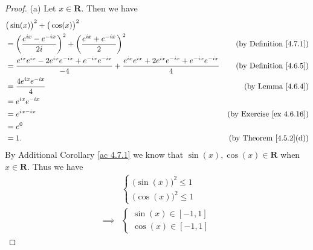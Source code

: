 \begin{proof}{(a)}
    Let \(x \in \mathbf{R}\).
    Then we have
    \begin{align*}
         & \big(\sin(x)\big)^2 + \big(\cos(x)\big)^2                                                                                                                                               \\
         & = \bigg(\frac{e^{i x} - e^{- i x}}{2i}\bigg)^2 + \bigg(\frac{e^{i x} + e^{- i x}}{2}\bigg)^2                                                     & \text{(by Definition \ref{4.7.1})}   \\
         & = \frac{e^{i x} e^{i x} - 2 e^{i x} e^{- i x} + e^{- i x} e^{- i x}}{-4} + \frac{e^{i x} e^{i x} + 2 e^{i x} e^{- i x} + e^{- i x} e^{- i x}}{4} & \text{(by Definition \ref{4.6.5})}   \\
         & = \frac{4 e^{i x} e^{- i x}}{4}                                                                                                                  & \text{(by Lemma \ref{4.6.4})}        \\
         & = e^{i x} e^{- i x}                                                                                                                                                                     \\
         & = e^{i x - i x}                                                                                                                                  & \text{(by Exercise \ref{ex 4.6.16})} \\
         & = e^0                                                                                                                                                                                   \\
         & = 1.                                                                                                                                             & \text{(by Theorem \ref{4.5.2}(d))}
    \end{align*}
    By Additional Corollary \ref{ac 4.7.1} we know that \(\sin(x), \cos(x) \in \mathbf{R}\) when \(x \in \mathbf{R}\).
    Thus we have
    \begin{align*}
                 & \begin{cases}
            \big(\sin(x)\big)^2 \leq 1 \\
            \big(\cos(x)\big)^2 \leq 1
        \end{cases} \\
        \implies & \begin{cases}
            \sin(x) \in [-1, 1] \\
            \cos(x) \in [-1, 1]
        \end{cases}
    \end{align*}
\end{proof}


